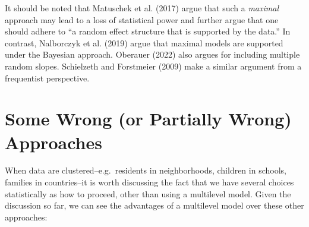\documentclass[
  letterpaper,
  DIV=11,
  numbers=noendperiod]{scrreprt}
\begin{document}
It should be noted that Matuschek et al. (2017) argue that such a
\emph{maximal} approach may lead to a loss of statistical power and
further argue that one should adhere to ``a random effect structure that
is supported by the data.'' In contrast, Nalborczyk et al. (2019) argue
that maximal models are supported under the Bayesian approach. Oberauer
(2022) also argues for including multiple random slopes. Schielzeth and
Forstmeier (2009) make a similar argument from a frequentist
perspective.

\hypertarget{sec-wrongapproaches}{%
\section{Some Wrong (or Partially Wrong)
Approaches}\label{sec-wrongapproaches}}

When data are clustered--e.g.~residents in neighborhoods, children in
schools, families in countries--it is worth discussing the fact that we
have several choices statistically as how to proceed, other than using a
multilevel model. Given the discussion so far, we can see the advantages
of a multilevel model over these other approaches:
\end{document}
